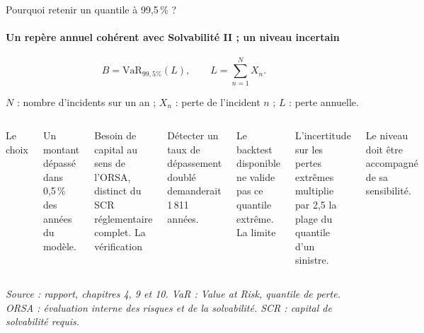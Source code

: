 \documentclass[aspectratio=169,10pt,t]{beamer}
\newcommand{\VaR}{\mathrm{VaR}}
\newcommand{\source}[1]{\par\vfill{\tiny\color{gris}\textit{Source : #1}}\par\vspace{-1mm}}
\begin{document}
\begin{frame}{Pourquoi retenir un quantile à 99,5\,\% ?}
  \suivimethode{}{}
  \framesubtitle{\etabli Un repère annuel cohérent avec Solvabilité II ; un niveau incertain}
  \[B=\VaR_{99{,}5\%}(L),\qquad L=\sum_{n=1}^{N}X_n.\]
  \begin{center}\footnotesize $N$ : nombre d'incidents sur un an ; $X_n$ : perte de l'incident $n$ ; $L$ : perte annuelle.\end{center}
  \vspace{3mm}
  \begin{columns}[T]
    {\editorial\normalsize Le choix}\par\vspace{2mm}
    \footnotesize Un montant dépassé dans 0,5\,\% des années du modèle.\par\vspace{2mm}
    Besoin de capital au sens de l'ORSA, distinct du SCR réglementaire complet.
    {\editorial\normalsize La vérification}\par\vspace{2mm}
    \footnotesize Détecter un taux de dépassement doublé demanderait 1\,811 années.\par\vspace{2mm}
    Le backtest disponible ne valide pas ce quantile extrême.
    {\editorial\normalsize La limite}\par\vspace{2mm}
    \footnotesize L'incertitude sur les pertes extrêmes multiplie par 2,5 la plage du quantile d'un sinistre.\par\vspace{2mm}
    Le niveau doit être accompagné de sa sensibilité.
  \end{columns}
  \source{rapport, chapitres 4, 9 et 10. VaR : Value at Risk, quantile de perte. ORSA : évaluation interne des risques et de la solvabilité. SCR : capital de solvabilité requis.}
\end{frame}
\end{document}
